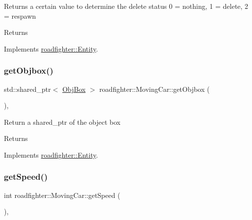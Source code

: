 Returns a certain value to determine the delete status 0 = nothing, 1 = delete, 2 = respawn \begin{DoxyReturn}{Returns}

\end{DoxyReturn}


Implements \hyperlink{classroadfighter_1_1Entity_a08190b0b8e6a3fcdb42273d6096152ac}{roadfighter\+::\+Entity}.

\mbox{\label{classroadfighter_1_1MovingCar_a8b744958eaba45078e98fad4ac6821c3}} 
\subsubsection{\texorpdfstring{get\+Objbox()}{getObjbox()}}
{\footnotesize\ttfamily std\+::shared\+\_\+ptr$<$ \hyperlink{structObjBox}{Obj\+Box} $>$ roadfighter\+::\+Moving\+Car\+::get\+Objbox (\begin{DoxyParamCaption}{ }\end{DoxyParamCaption})\hspace{0.3cm}{\ttfamily [override]}, {\ttfamily [virtual]}}

Return a shared\+\_\+ptr of the object box \begin{DoxyReturn}{Returns}

\end{DoxyReturn}


Implements \hyperlink{classroadfighter_1_1Entity_af14340d04a725175a6d221f23c35fa0c}{roadfighter\+::\+Entity}.

\mbox{\label{classroadfighter_1_1MovingCar_a42bdd9382e7234ae79d6f5e582adee92}} 
\subsubsection{\texorpdfstring{get\+Speed()}{getSpeed()}}
{\footnotesize\ttfamily int roadfighter\+::\+Moving\+Car\+::get\+Speed (\begin{DoxyParamCaption}{ }\end{DoxyParamCaption})\hspace{0.3cm}{\ttfamily [override]}, {\ttfamily [virtual]}}


